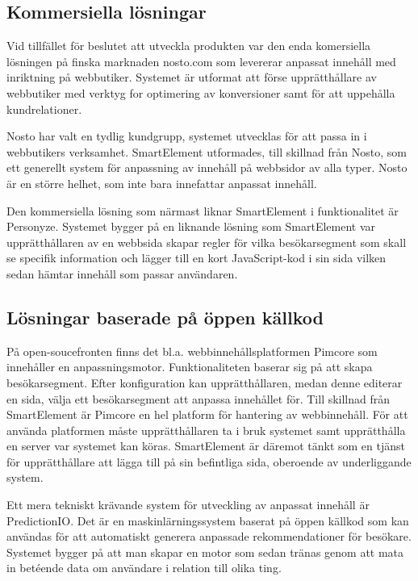 \subsection{Kommersiella lösningar}

Vid tillfället för beslutet att utveckla produkten var den enda komersiella lösningen på finska marknaden nosto.com som levererar anpassat innehåll med inriktning på webbutiker. Systemet är utformat att förse upprätthållare av webbutiker med verktyg for optimering av konversioner samt för att uppehålla kundrelationer. \citep{nosto}

Nosto har valt en tydlig kundgrupp, systemet utvecklas för att passa in i webbutikers verksamhet. SmartElement utformades, till skillnad från Nosto, som ett generellt system för anpassning av innehåll på webbsidor av alla typer. Nosto är en större helhet, som inte bara innefattar anpassat innehåll.

Den kommersiella lösning som närmast liknar SmartElement i funktionalitet är Personyze. Systemet bygger på en liknande lösning som SmartElement var upprätthållaren av en webbsida skapar regler för vilka besökarsegment som skall se specifik information och lägger till en kort JavaScript-kod i sin sida vilken sedan hämtar innehåll som passar användaren. \citep{personyze}

\subsection{Lösningar baserade på öppen källkod}

På open-soucefronten finns det bl.a. webbinnehållsplatformen Pimcore som innehåller en anpassningsmotor. Funktionaliteten baserar sig på att skapa besökarsegment. Efter konfiguration kan upprätthållaren, medan denne editerar en sida, välja ett besökarsegment att anpassa innehållet för. \citep{pimcore}
Till skillnad från SmartElement är Pimcore en hel platform för hantering av webbinnehåll. För att använda platformen måste upprätthållaren ta i bruk systemet samt upprätthålla en server var systemet kan köras. SmartElement är däremot tänkt som en tjänst för upprätthållare att lägga till på sin befintliga sida, oberoende av underliggande system.

Ett mera tekniskt krävande system för utveckling av anpassat innehåll är PredictionIO. Det är en maskinlärningssystem baserat på öppen källkod som kan användas för att automatiskt generera anpassade rekommendationer för besökare. Systemet bygger på att man skapar en motor som sedan tränas genom att mata in betéende data om användare i relation till olika ting. \citep{predicionioconcepts}


